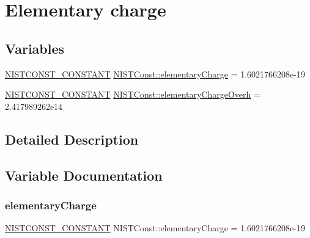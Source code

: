 \hypertarget{group___n_i_s_t_const-_elementary_charge}{}\section{Elementary charge}
\label{group___n_i_s_t_const-_elementary_charge}
\subsection*{Variables}
\begin{DoxyCompactItemize}
\item 
\mbox{\hyperlink{group___n_i_s_t_const-_macros_ga2b0fc1d7452373f816175dd86ce26729}{N\+I\+S\+T\+C\+O\+N\+S\+T\+\_\+\+C\+O\+N\+S\+T\+A\+NT}} \mbox{\hyperlink{group___n_i_s_t_const-_elementary_charge_ga8685ffddeaed87687d2ee0539b4625de}{N\+I\+S\+T\+Const\+::elementary\+Charge}} = 1.\+6021766208e-\/19
\item 
\mbox{\hyperlink{group___n_i_s_t_const-_macros_ga2b0fc1d7452373f816175dd86ce26729}{N\+I\+S\+T\+C\+O\+N\+S\+T\+\_\+\+C\+O\+N\+S\+T\+A\+NT}} \mbox{\hyperlink{group___n_i_s_t_const-_elementary_charge_gae14d69d686990378677cd8072ce9873b}{N\+I\+S\+T\+Const\+::elementary\+Charge\+Overh}} = 2.\+417989262e14
\end{DoxyCompactItemize}


\subsection{Detailed Description}


\subsection{Variable Documentation}
\mbox{\label{group___n_i_s_t_const-_elementary_charge_ga8685ffddeaed87687d2ee0539b4625de}} 
\subsubsection{\texorpdfstring{elementary\+Charge}{elementaryCharge}}
{\footnotesize\ttfamily \mbox{\hyperlink{group___n_i_s_t_const-_macros_ga2b0fc1d7452373f816175dd86ce26729}{N\+I\+S\+T\+C\+O\+N\+S\+T\+\_\+\+C\+O\+N\+S\+T\+A\+NT}} N\+I\+S\+T\+Const\+::elementary\+Charge = 1.\+6021766208e-\/19}

